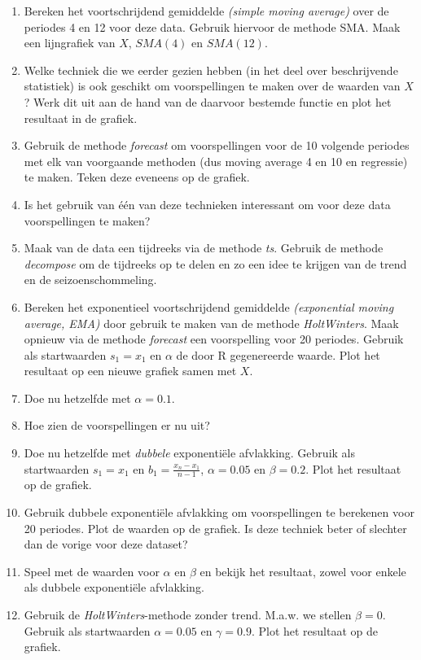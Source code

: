 \begin{exercise}
\begin{enumerate}
  \item Bereken het voortschrijdend gemiddelde \emph{(simple moving average)} over de periodes 4 en 12 voor deze data. Gebruik hiervoor de methode SMA. Maak een lijngrafiek van $X$, $SMA(4)$ en $SMA(12)$.
  \item Welke techniek die we eerder gezien hebben (in het deel over beschrijvende statistiek) is ook geschikt om voorspellingen te maken over de waarden van $X$? Werk dit uit aan de hand van de daarvoor bestemde functie en plot het resultaat in de grafiek.
  \item Gebruik de methode \emph{forecast} om voorspellingen voor de 10 volgende periodes met elk van voorgaande methoden (dus moving average 4 en 10 en regressie) te maken. Teken deze eveneens op de grafiek.
  \item Is het gebruik van één van deze technieken interessant om voor deze data voorspellingen te maken? 
  \item Maak van de data een tijdreeks via de methode \emph{ts}. Gebruik de methode \emph{decompose} om de tijdreeks op te delen en zo een idee te krijgen van de trend en de seizoenschommeling.
  \item Bereken het exponentieel voortschrijdend gemiddelde \emph{(exponential moving average, EMA)} door gebruik te maken van de methode \emph{HoltWinters}. Maak opnieuw via de methode \emph{forecast} een voorspelling voor 20 periodes. Gebruik als startwaarden $s_1 = x_1$ en $\alpha $ de door R gegenereerde waarde. Plot het resultaat op een nieuwe grafiek samen met $X$.
  \item Doe nu hetzelfde met $\alpha=0.1$. 
  \item Hoe zien de voorspellingen er nu uit?
  \item Doe nu hetzelfde met \emph{dubbele} exponentiële afvlakking. Gebruik als startwaarden $s_1 = x_1$ en $b_1 = \frac{x_n - x_1}{n - 1}$, $\alpha =  0.05$ en $\beta = 0.2$. Plot het resultaat op de grafiek.
  \item Gebruik dubbele exponentiële afvlakking om voorspellingen te berekenen voor 20 periodes. Plot de waarden op de grafiek. Is deze techniek beter of slechter dan de vorige voor deze dataset?
  \item Speel met de waarden voor $\alpha$ en $\beta$ en bekijk het resultaat, zowel voor enkele als dubbele exponentiële afvlakking.
  \item Gebruik de \emph{HoltWinters}-methode zonder trend.  M.a.w. we stellen $\beta=0$. Gebruik als startwaarden $\alpha =  0.05$ en $\gamma = 0.9$. Plot het resultaat op de grafiek.

\end{enumerate}
\end{exercise}
